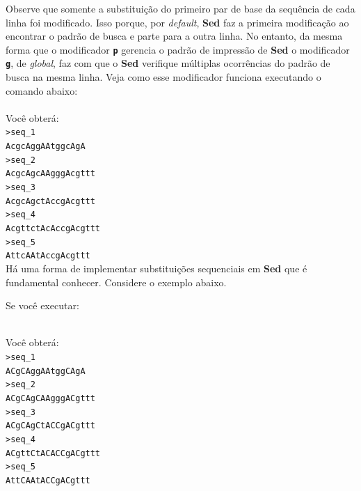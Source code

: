 \begin{refsection}
Observe que somente a substituição do primeiro par de base da sequência de cada linha foi modificado. Isso porque, por \textit{default}, \textbf{Sed} faz a primeira modificação ao encontrar o padrão de busca e parte para a outra linha. No entanto, da mesma forma que o modificador \texttt{\textbf{p}} gerencia o padrão de impressão de \textbf{Sed} o modificador \texttt{\textbf{g}}, de \textit{global}, faz com que o \textbf{Sed} verifique múltiplas ocorrências do padrão de busca na mesma linha. Veja como esse modificador funciona executando o comando abaixo:\\

\\


Você obterá:\\
\texttt{>seq\_1}\\
\texttt{AcgcAggAAtggcAgA}\\
\texttt{>seq\_2}\\
\texttt{AcgcAgcAAgggAcgttt}\\
\texttt{>seq\_3}\\
\texttt{AcgcAgctAccgAcgttt}\\
\texttt{>seq\_4}\\
\texttt{AcgttctAcAccgAcgttt}\\
\texttt{>seq\_5}\\
\texttt{AttcAAtAccgAcgttt}\\

Há uma forma de implementar substituições sequenciais em \textbf{Sed} que é fundamental conhecer. Considere o exemplo abaixo.

Se você executar:

\\

Você obterá:\\
\texttt{>seq\_1}\\
\texttt{ACgCAggAAtggCAgA}\\
\texttt{>seq\_2}\\
\texttt{ACgCAgCAAgggACgttt}\\
\texttt{>seq\_3}\\
\texttt{ACgCAgCtACCgACgttt}\\
\texttt{>seq\_4}\\
\texttt{ACgttCtACACCgACgttt}\\
\texttt{>seq\_5}\\
\texttt{AttCAAtACCgACgttt}\\


\end{refsection}
